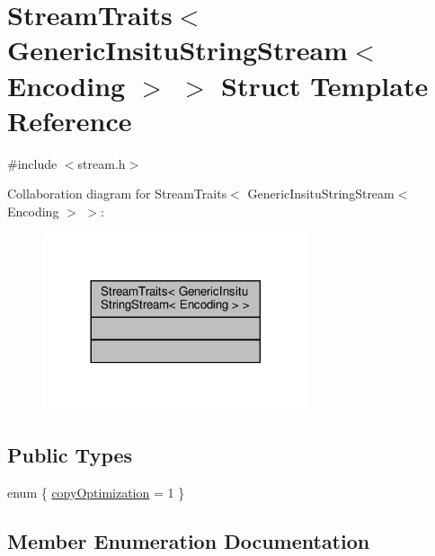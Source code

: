 \hypertarget{structStreamTraits_3_01GenericInsituStringStream_3_01Encoding_01_4_01_4}{}\section{Stream\+Traits$<$ Generic\+Insitu\+String\+Stream$<$ Encoding $>$ $>$ Struct Template Reference}
\label{structStreamTraits_3_01GenericInsituStringStream_3_01Encoding_01_4_01_4}


{\ttfamily \#include $<$stream.\+h$>$}



Collaboration diagram for Stream\+Traits$<$ Generic\+Insitu\+String\+Stream$<$ Encoding $>$ $>$\+:
\nopagebreak
\begin{figure}[H]
\begin{center}
\leavevmode
\includegraphics[width=221pt]{structStreamTraits_3_01GenericInsituStringStream_3_01Encoding_01_4_01_4__coll__graph}
\end{center}
\end{figure}
\subsection*{Public Types}
\begin{DoxyCompactItemize}
\item 
enum \{ \hyperlink{structStreamTraits_3_01GenericInsituStringStream_3_01Encoding_01_4_01_4_aba5f0bc6f5bfad575279776a2cd8dc7ba8d0f051fca7788dc2aeaadd6e5a153ed}{copy\+Optimization} = 1
 \}
\end{DoxyCompactItemize}


\subsection{Member Enumeration Documentation}
\mbox{\label{structStreamTraits_3_01GenericInsituStringStream_3_01Encoding_01_4_01_4_aba5f0bc6f5bfad575279776a2cd8dc7b}} 
